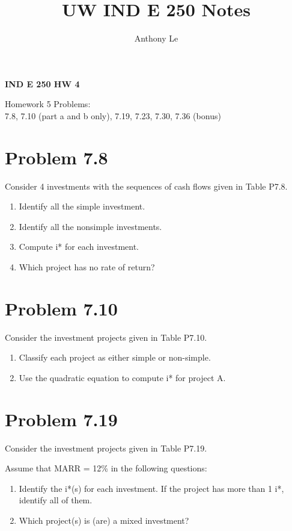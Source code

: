 \documentclass[../INDE250HW.tex]{subfiles}
\title{UW IND E 250 Notes}
\author{Anthony Le}
\begin{document}
\pagestyle{fancy}
\fancyhead{}

\begin{center}
    \LARGE{\textbf{IND E 250 HW 4}}
\end{center}
\begin{center}
    Homework 5 Problems: \\
    7.8, 7.10 (part a and b only), 7.19, 7.23, 7.30, 7.36 (bonus)
\end{center}

\section*{Problem 7.8}
\begin{exmp}
    Consider 4 investments with the sequences of cash flows given in Table P7.8.
    \begin{enumerate}
        \item Identify all the simple investment.
        \item Identify all the nonsimple investments.
        \item Compute i* for each investment.
        \item Which project has no rate of return?
    \end{enumerate}
\end{exmp}



\section*{Problem 7.10}
\begin{exmp}
    Consider the investment projects given in Table P7.10.
    \begin{enumerate}
        \item Classify each project as either simple or non-simple.
        \item Use the quadratic equation to compute i* for project A.
    \end{enumerate}
\end{exmp}


\section*{Problem 7.19}
\begin{exmp}
    Consider the investment projects given in Table P7.19.
    
    Assume that MARR = 12\% in the following questions:
    \begin{enumerate}
        \item Identify the i*(s) for each investment. If the project has more than 1 i*, identify all of them.
        \item Which project(s) is (are) a mixed investment?
    \end{enumerate}
\end{exmp}
\end{document}
